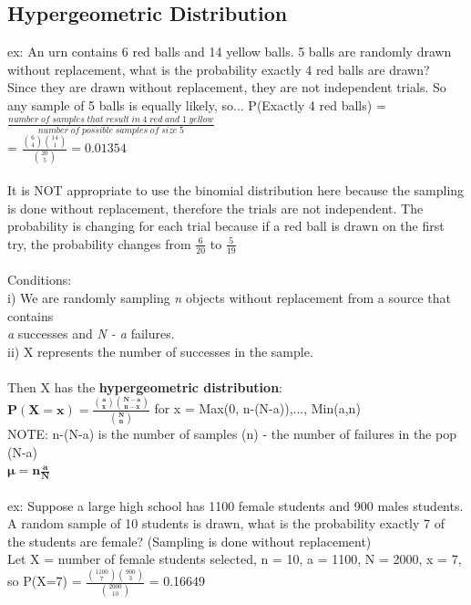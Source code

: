 \documentclass[12pt, a4paper]{article}
\begin{document}
	\subsection{Hypergeometric Distribution}
	ex: An urn contains 6 red balls and 14 yellow balls. 5 balls are randomly drawn without replacement, what is the probability exactly 4 red balls are drawn? \\
	Since they are drawn without replacement, they are not independent trials. So any sample of 5 balls is equally likely, so... P(Exactly 4 red balls) = $\frac{number\;of\;samples\;that\;result\;in\;4\;red\;and\;1\;yellow} {number\;of\;possible\;samples\;of\;size\;5}$ \\ = $\frac{\binom{6}{4}\binom{14}{1}}{\binom{20}{5}} = 0.01354$ \\~\\
	It is NOT appropriate to use the binomial distribution here because the sampling is done without replacement, therefore the trials are not independent. The probability is changing for each trial because if a red ball is drawn on the first try, the probability changes from $\frac{6}{20}$ to $\frac{5}{19}$ \\~\\
	Conditions: \\
	i) We are randomly sampling \textit{n} objects without replacement from a source that contains \\\hspace*{4mm} \textit{a} successes and \textit{N - a} failures. \\
	ii) X represents the number of successes in the sample. \\~\\
	Then X has the \textbf{hypergeometric distribution}: \\
	\textbf{$\mathbf{P(X=x) = \frac{\binom{a}{x}\binom{N-a}{n-x}}{\binom{N}{n}}}$} for x = Max(0, n-(N-a)),..., Min(a,n) \\
	NOTE: n-(N-a) is the number of samples (n) - the number of failures in the pop (N-a) \\
	$\mathbf{\mu = n \frac{a}{N}}$ \\~\\
	ex: Suppose a large high school has 1100 female students and 900 males students. A random sample of 10 students is drawn, what is the probability exactly 7 of the students are female? (Sampling is done without replacement) \\
	Let X = number of female students selected, n = 10, a = 1100, N = 2000, x = 7, \\
	so P(X=7) = $\frac{\binom{1100}{7}\binom{900}{3}}{\binom{2000}{10}}$ = 0.16649 \\~\\
	
\end{document}
